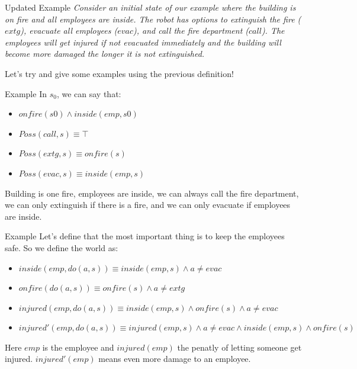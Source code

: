 \documentclass[compress,xcolor=table]{beamer}
\begin{document}
\begin{frame}{Updated Example}
    \textit{Consider an initial state of our example where the building is on fire and all employees are inside. The robot has options to extinguish the fire ($extg$), evacuate all employees ($evac$), and call the fire department ($call$). The employees will get injured if not evacuated immediately and the building will become more damaged the longer it is not extinguished.}\\
    \pause
    \begin{block}{}
    Let's try and give some examples using the previous definition!    
    \end{block}
    
\end{frame}

\begin{frame}{Example}
    In $s_0$, we can say that:
    \begin{itemize}
        \item $onfire(s0) \wedge inside(emp, s0)$
        \item $Poss(call, s) \equiv \top$
        \item $Poss(extg, s) \equiv onfire(s)$
        \item $Poss(evac, s) \equiv inside(emp, s)$
    \end{itemize}
    
    Building is one fire, employees are inside, we can always call the fire department,
    we can only extinguish if there is a fire, and we can only evacuate if employees are inside.
    
\end{frame}

\begin{frame}{Example}
    Let's define that the most important thing is to keep the employees safe. So we define the world as:\\
    \begin{itemize}
        \item $inside(emp, do(a, s)) \equiv inside(emp, s) \land a \neq evac$
        \item $onfire(do(a, s)) \equiv onfire(s) \land a \neq extg$
        \item $injured(emp, do(a, s)) \equiv inside(emp, s) \land onfire(s) \land a \neq evac$
        \item $injured'(emp, do(a, s)) \equiv injured(emp, s) \land a \neq evac \land inside(emp, s) \land onfire(s)$
    \end{itemize}
    Here $emp$ is the employee and $injured(emp)$ the penatly of letting someone get injured. 
    $injured'(emp)$ means even more damage to an employee.\\
\end{frame}
\end{document}
